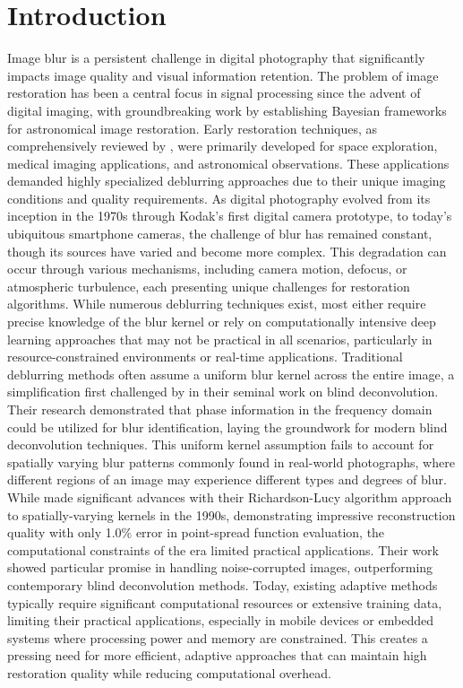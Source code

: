 \documentclass[twoside,11pt]{article}
\begin{document}
\section{Introduction}
Image blur is a persistent challenge in digital photography that significantly impacts image quality and visual information retention. The problem of image restoration has been a central focus in signal processing since the advent of digital imaging, with groundbreaking work by \citet{molina2001image} establishing Bayesian frameworks for astronomical image restoration. Early restoration techniques, as comprehensively reviewed by \citet{banham1997digital}, were primarily developed for space exploration, medical imaging applications, and astronomical observations. These applications demanded highly specialized deblurring approaches due to their unique imaging conditions and quality requirements. As digital photography evolved from its inception in the 1970s through Kodak's first digital camera prototype, to today's ubiquitous smartphone cameras, the challenge of blur has remained constant, though its sources have varied and become more complex. This degradation can occur through various mechanisms, including camera motion, defocus, or atmospheric turbulence, each presenting unique challenges for restoration algorithms. While numerous deblurring techniques exist, most either require precise knowledge of the blur kernel or rely on computationally intensive deep learning approaches that may not be practical in all scenarios, particularly in resource-constrained environments or real-time applications.
\singlespacing
Traditional deblurring methods often assume a uniform blur kernel across the entire image, a simplification first challenged by \citet{cannon1976blind} in their seminal work on blind deconvolution. Their research demonstrated that phase information in the frequency domain could be utilized for blur identification, laying the groundwork for modern blind deconvolution techniques. This uniform kernel assumption fails to account for spatially varying blur patterns commonly found in real-world photographs, where different regions of an image may experience different types and degrees of blur. While \citet{fish1995blind} made significant advances with their Richardson-Lucy algorithm approach to spatially-varying kernels in the 1990s, demonstrating impressive reconstruction quality with only 1.0\% error in point-spread function evaluation, the computational constraints of the era limited practical applications. Their work showed particular promise in handling noise-corrupted images, outperforming contemporary blind deconvolution methods. Today, existing adaptive methods typically require significant computational resources or extensive training data, limiting their practical applications, especially in mobile devices or embedded systems where processing power and memory are constrained. This creates a pressing need for more efficient, adaptive approaches that can maintain high restoration quality while reducing computational overhead.
\end{document}
